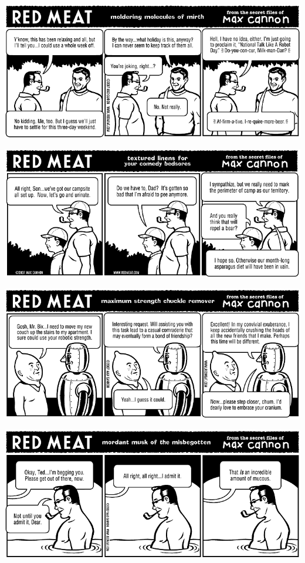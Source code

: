 \documentclass[a4paper,twoside,11pt]{article}
\begin{document}
\includegraphics[width=\textwidth]{redmeat_2007-11-20.png}



\includegraphics[width=\textwidth]{redmeat_2007-11-27.png}



\includegraphics[width=\textwidth]{redmeat_2007-12-04.png}



\includegraphics[width=\textwidth]{redmeat_2007-12-11.png}
\end{document}
